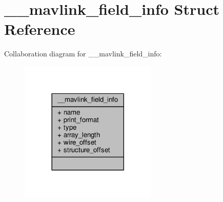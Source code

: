 \hypertarget{struct____mavlink__field__info}{\section{\+\_\+\+\_\+mavlink\+\_\+field\+\_\+info Struct Reference}
\label{struct____mavlink__field__info}
}


Collaboration diagram for \+\_\+\+\_\+mavlink\+\_\+field\+\_\+info\+:
\nopagebreak
\begin{figure}[H]
\begin{center}
\leavevmode
\includegraphics[width=185pt]{struct____mavlink__field__info__coll__graph}
\end{center}
\end{figure}
